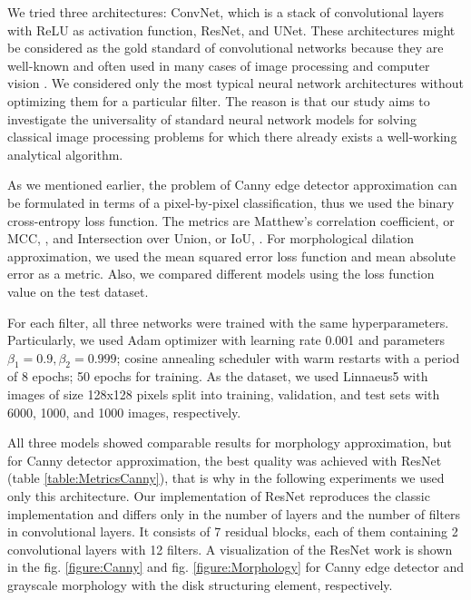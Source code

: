 We tried three architectures: ConvNet, which is a stack of convolutional layers with ReLU as activation function, ResNet, and UNet. These architectures might be considered as the gold standard of convolutional networks because they are well-known and often used in many cases of image processing and computer vision \citep{CNNSurvey}. We considered only the most typical neural network architectures without optimizing them for a particular filter. The reason is that our study aims to investigate the universality of standard neural network models for solving classical image processing problems for which there already exists a well-working analytical algorithm.  


As we mentioned earlier, the problem of Canny edge detector approximation can be formulated in terms of a pixel-by-pixel classification, thus we used the binary cross-entropy loss function. The metrics are Matthew's correlation coefficient, or MCC, \citep{TubeCountour}, and Intersection over Union, or IoU,  \citep{EdgeDetectionIOU}. For morphological dilation approximation, we used the mean squared error loss function and mean absolute error as a metric. Also, we compared different models using the loss function value on the test dataset. 

For each filter, all three networks were trained with the same hyperparameters. Particularly, we used Adam optimizer with learning rate 0.001 and parameters $\beta_1 = 0.9, \beta_2 = 0.999$; cosine annealing scheduler with warm restarts with a period of 8 epochs; 50 epochs for training. As the dataset, we used Linnaeus5 with images of size 128x128 pixels split into training, validation, and test sets with 6000, 1000, and 1000 images, respectively. 

All three models showed comparable results for morphology approximation, but for Canny detector approximation, the best quality was achieved with ResNet (table \ref{table:MetricsCanny}), that is why in the following experiments we used only this architecture. Our implementation of ResNet reproduces the classic implementation and differs only in the number of layers and the number of filters in convolutional layers. It consists of 7 residual blocks, each of them containing 2 convolutional layers with 12 filters. A visualization of the ResNet work is shown in the fig. \ref{figure:Canny} and fig. \ref{figure:Morphology} for Canny edge detector and grayscale morphology with the disk structuring element, respectively.

